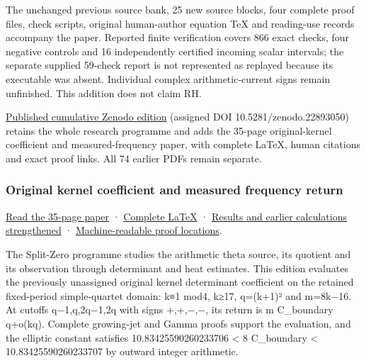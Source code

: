 \documentclass[
]{article}
\begin{document}
The unchanged previous source bank, 25 new source blocks, four complete
proof files, check scripts, original human-author equation TeX and
reading-use records accompany the paper. Reported finite verification
covers 866 exact checks, four negative controls and 16 independently
certified incoming scalar intervals; the separate supplied 59-check
report is not represented as replayed because its executable was absent.
Individual complex arithmetic-current signs remain unfinished. This
addition does not claim RH.

\href{https://zenodo.org/records/22893050}{Published cumulative Zenodo
edition} (assigned DOI 10.5281/zenodo.22893050) retains the whole
research programme and adds the 35-page original-kernel coefficient and
measured-frequency paper, with complete LaTeX, human citations and exact
proof links. All 74 earlier PDFs remain separate.

\subsubsection{Original kernel coefficient and measured frequency
return}\label{original-kernel-coefficient-and-measured-frequency-return}

\href{https://github.com/KokunoYumeto/zeta-function-research-reader/blob/main/workbenches/splitzero-tandem/continuations/20260922-kernel-frequency/KERNEL_AND_FREQUENCY_READER.pdf}{Read
the 35-page paper} ·
\href{https://github.com/KokunoYumeto/zeta-function-research-reader/blob/main/workbenches/splitzero-tandem/continuations/20260922-kernel-frequency/KERNEL_AND_FREQUENCY_READER.tex}{Complete
LaTeX} ·
\href{https://github.com/KokunoYumeto/zeta-function-research-reader/blob/main/workbenches/splitzero-tandem/continuations/20260922-kernel-frequency/RESULTS_20260922_024.md}{Results
and earlier calculations strengthened} ·
\href{https://github.com/KokunoYumeto/zeta-function-research-reader/blob/main/workbenches/splitzero-tandem/continuations/20260922-kernel-frequency/RESULT_INDEX.json}{Machine-readable
proof locations}.

The Split-Zero programme studies the arithmetic theta source, its
quotient and its observation through determinant and heat estimates.
This edition evaluates the previously unassigned original kernel
determinant coefficient on the retained fixed-period simple-quartet
domain: k≡1 mod4, k≥17, q=(k+1)² and m=8k−16. At cutoffs q−1,q,2q−1,2q
with signs +,+,−,−, its return is m C\_boundary q+o(kq). Complete
growing-jet and Gamma proofs support the evaluation, and the elliptic
constant satisfies 10.83425590260233706 \textless{} 8 C\_boundary
\textless{} 10.83425590260233707 by outward integer arithmetic.
\end{document}

